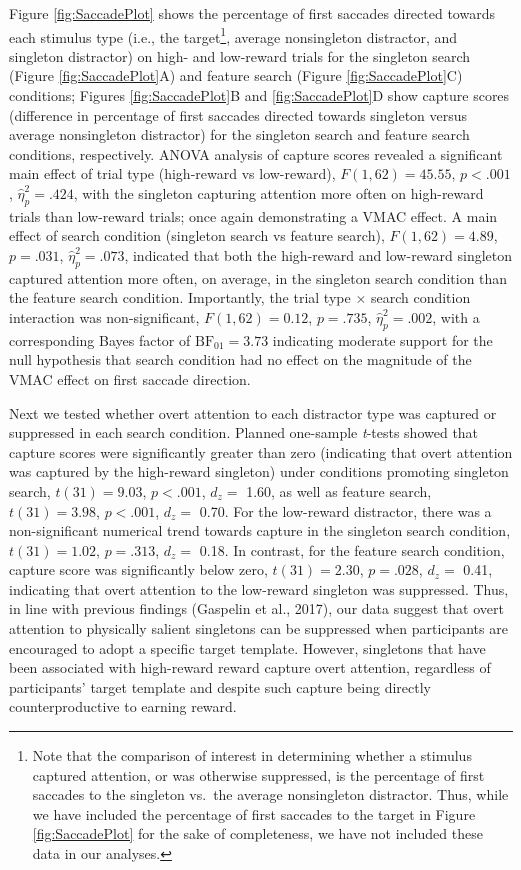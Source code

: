 \documentclass[jou, a4paper, noextraspace,floatsintext]{apa6}
\let\rmarkdownfootnote\footnote%
\def\footnote{\protect\rmarkdownfootnote}
\theoremstyle{definition}
\theoremstyle{definition}
\theoremstyle{definition}
\theoremstyle{remark}
\begin{document}
Figure \ref{fig:SaccadePlot} shows the percentage of first saccades
directed towards each stimulus type (i.e., the target\footnote{Note that
  the comparison of interest in determining whether a stimulus captured
  attention, or was otherwise suppressed, is the percentage of first
  saccades to the singleton vs.~the average nonsingleton distractor.
  Thus, while we have included the percentage of first saccades to the
  target in Figure \ref{fig:SaccadePlot} for the sake of completeness,
  we have not included these data in our analyses.}, average
nonsingleton distractor, and singleton distractor) on high- and
low-reward trials for the singleton search (Figure
\ref{fig:SaccadePlot}A) and feature search (Figure
\ref{fig:SaccadePlot}C) conditions; Figures \ref{fig:SaccadePlot}B and
\ref{fig:SaccadePlot}D show capture scores (difference in percentage of
first saccades directed towards singleton versus average nonsingleton
distractor) for the singleton search and feature search conditions,
respectively. ANOVA analysis of capture scores revealed a significant
main effect of trial type (high-reward vs low-reward),
\(F(1, 62) = 45.55\), \(p < .001\), \(\hat{\eta}^2_p = .424\), with the
singleton capturing attention more often on high-reward trials than
low-reward trials; once again demonstrating a VMAC effect. A main effect
of search condition (singleton search vs feature search),
\(F(1, 62) = 4.89\), \(p = .031\), \(\hat{\eta}^2_p = .073\), indicated
that both the high-reward and low-reward singleton captured attention
more often, on average, in the singleton search condition than the
feature search condition. Importantly, the trial type \(\times\) search
condition interaction was non-significant, \(F(1, 62) = 0.12\),
\(p = .735\), \(\hat{\eta}^2_p = .002\), with a corresponding Bayes
factor of \(\mathrm{BF}_{\textrm{01}} = 3.73\) indicating moderate
support for the null hypothesis that search condition had no effect on
the magnitude of the VMAC effect on first saccade direction.

Next we tested whether overt attention to each distractor type was
captured or suppressed in each search condition. Planned one-sample
\emph{t}-tests showed that capture scores were significantly greater
than zero (indicating that overt attention was captured by the
high-reward singleton) under conditions promoting singleton search,
\(t(31) = 9.03\), \(p < .001\), \(d_z=\) 1.60, as well as feature
search, \(t(31) = 3.98\), \(p < .001\), \(d_z=\) 0.70. For the
low-reward distractor, there was a non-significant numerical trend
towards capture in the singleton search condition, \(t(31) = 1.02\),
\(p = .313\), \(d_z=\) 0.18. In contrast, for the feature search
condition, capture score was significantly below zero, \(t(31) = 2.30\),
\(p = .028\), \(d_z=\) 0.41, indicating that overt attention to the
low-reward singleton was suppressed. Thus, in line with previous
findings (Gaspelin et al., 2017), our data suggest that overt attention
to physically salient singletons can be suppressed when participants are
encouraged to adopt a specific target template. However, singletons that
have been associated with high-reward reward capture overt attention,
regardless of participants' target template and despite such capture
being directly counterproductive to earning reward.
\end{document}
